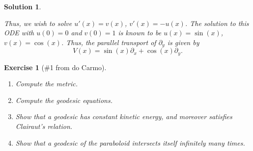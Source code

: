 \documentclass{article}
\theoremstyle{plain}
\newtheorem*{ex}{Exercise}
\theoremstyle{nonumberplain}
\newtheorem{sol}{Solution}
\begin{document}
\begin{sol}
\begin{enumerate}
Thus, we wish to solve $u'(x) = v(x)$, $v'(x) = - u(x)$. The solution to this ODE with $u(0) = 0$ and $v(0) = 1$ is known to be $u(x) = \sin(x)$, $v(x) = \cos(x)$. Thus, the parallel transport of $\partial_y$ is given by
\begin{equation}
V(x) = \sin(x) \partial_x + \cos(x) \partial_y.
\end{equation}
\end{enumerate}
\end{sol}

\begin{ex}[\#1 from do Carmo]
\leavevmode
\begin{enumerate}
\item Compute the metric.
\item Compute the geodesic equations.
\item Show that a geodesic has constant kinetic energy, and moreover satisfies Clairaut's relation.
\item Show that a geodesic of the paraboloid intersects itself infinitely many times.
\end{enumerate}
\end{ex}
\end{document}
